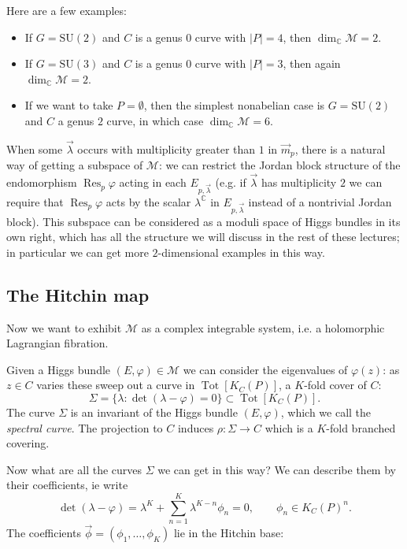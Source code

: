\documentclass[12pt,letterpaper,reqno]{article}
\numberwithin{equation}{section}
\newcommand{\cM}{\ensuremath{\mathcal M}}
\newcommand{\C}{\ensuremath{\mathbb C}}
\newcommand{\abs}[1]{\lvert#1\rvert}
\newcommand{\vphi}{{\vec\phi}}
\newcommand{\ti}[1]{\textit{#1}}
\DeclareMathOperator{\Res}{Res}
\DeclareMathOperator{\Tot}{Tot}
\newcommand{\SU}{\mathrm{SU}}
\newcommand{\insfig}[2]{

\medskip
\noindent
\begin{minipage}{\linewidth}

\makebox[\linewidth]{\texttt{[image: figures/\#1-crop.pdf]}}

\end{minipage}
\medskip

}
\begin{document}
\begin{example} Here are a few examples:
\begin{itemize}
\item If $G = \SU(2)$ and $C$ is a genus $0$ curve with $\abs{P} = 4$,
then $\dim_\C \cM = 2$.
\item If $G = \SU(3)$
and $C$ is a genus $0$ curve with $\abs{P}=3$,
then again $\dim_\C \cM = 2$.
\item If we want to take $P = \emptyset$,
then the simplest nonabelian case is
$G = \SU(2)$ and $C$ a genus $2$ curve, in which case
$\dim_\C \cM = 6$. 
\end{itemize}
\end{example}

\begin{remark}
When some $\vec\lambda$ occurs with multiplicity
greater than $1$ in $\vec{m}_p$, there 
is a natural way of getting a subspace of $\cM$:
we can restrict the Jordan block structure of
the endomorphism $\Res_p \varphi$
acting in each $E_{p,\vec\lambda}$ (e.g. if $\vec\lambda$ has
multiplicity $2$ we can require that $\Res_p \varphi$ acts
by the scalar $\lambda^\C$ in $E_{p,\vec\lambda}$ instead of
a nontrivial Jordan block). This subspace can be considered
as a moduli space of Higgs bundles in its own right, which
has all the structure we will discuss
in the rest of these lectures; 
in particular we can get
more $2$-dimensional examples in this way.
\end{remark}



\subsection{The Hitchin map}

Now we want to exhibit $\cM$ as a complex integrable system,
i.e. a holomorphic Lagrangian fibration.

Given a Higgs bundle $(E,\varphi) \in \cM$ we can consider
the eigenvalues of $\varphi(z)$: as $z \in C$ varies
these sweep out a curve in $\Tot[K_C(P)]$, a $K$-fold cover of $C$:
\begin{equation}
  \Sigma = \{ \lambda: \det(\lambda - \varphi) = 0\} \subset \Tot[K_C(P)].
\end{equation}
The curve $\Sigma$ is an invariant of the Higgs 
bundle $(E,\varphi)$, which we call
the \ti{spectral curve}. 
The projection to $C$ induces $\rho: \Sigma \to C$ which is a $K$-fold branched covering.
\insfig{higgs-metric-17}{0.8}
Now what are all the curves $\Sigma$
we can get in this way?
We can describe them by their coefficients, ie write
\begin{equation} \label{eq:spectral-coeffs}
  \det(\lambda - \varphi) = \lambda^K + \sum_{n=1}^K \lambda^{K-n} \phi_n = 0, \qquad \phi_n \in K_C(P)^n.
\end{equation}
The coefficients $\vphi = (\phi_1, \dots, \phi_K)$ lie in the Hitchin base:
\end{document}
